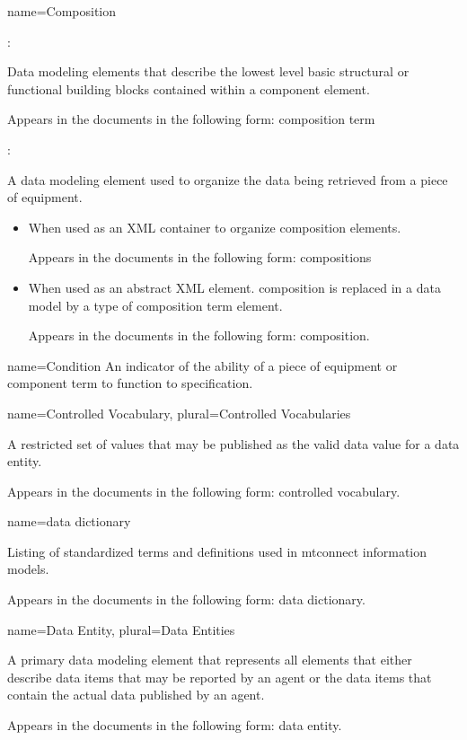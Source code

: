 {
  name={Composition}
}
{
  :

  Data modeling elements that describe the lowest level basic structural or functional building blocks contained within a \gls{component} element.

  Appears in the documents in the following form: \gls{composition term}

  :

  A data modeling element used to organize the data being retrieved from a piece of equipment.

  \begin{itemize}
      \item When used as an XML container to organize \gls{composition} elements. 
      
      Appears in the documents in the following form: \gls{compositions}
      
      \item When used as an abstract XML element. \gls{composition} is replaced in a data model by a type of \gls{composition term} element. 
      
      Appears in the documents in the following form: \gls{composition}.
  \end{itemize}
}


{
  name={Condition}
}
{
	An indicator of the ability of a piece of equipment or \gls{component term} to function to specification.
}


{
  name={Controlled Vocabulary},
  plural={Controlled Vocabularies}
}
{
	A restricted set of values that may be published as the \gls{valid data value} for a \gls{data entity}.

	Appears in the documents in the following form: \gls{controlled vocabulary}.
}


{
  name={data dictionary}
}
{
	Listing of standardized terms and definitions used in \glspl{mtconnect information model}.

	Appears in the documents in the following form: \gls{data dictionary}.
}


{
  name={Data Entity},
  plural={Data Entities}
}
{
	A primary data modeling element that represents all elements that either describe data items that may be reported by an \gls{agent} or the data items that contain the actual data published by an \gls{agent}.

	Appears in the documents in the following form: \gls{data entity}.
}


